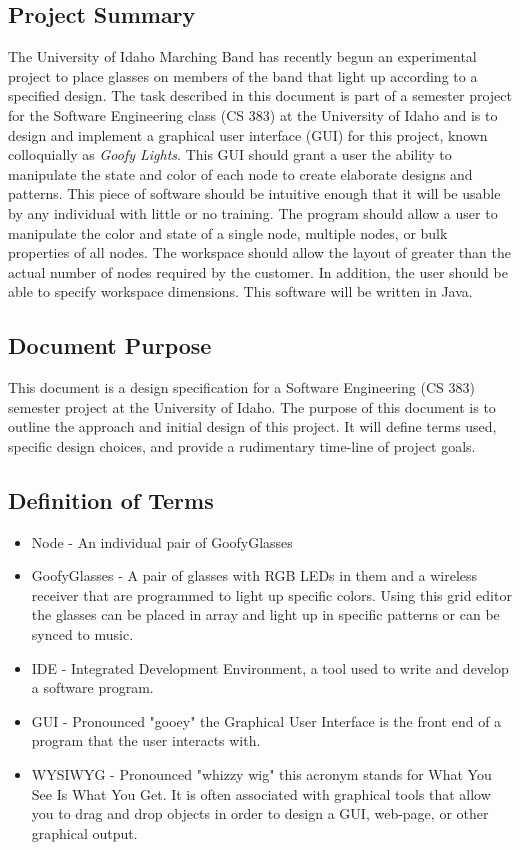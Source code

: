 \documentclass[12pt]{article}
\begin{document}
		\subsection{Project Summary}
  		The University of Idaho Marching Band has recently begun an experimental project to place glasses on members of the band that light up according to a specified design. The task described in this document is part of a semester project for the Software Engineering class (CS 383) at the University of Idaho and is to design and implement a graphical user interface (GUI) for this project, known colloquially as \textit{Goofy Lights}. This GUI should grant a user the ability to manipulate the state and color of each node to create elaborate designs and patterns. This piece of software should be intuitive enough that it will be usable by any individual with little or no training. The program should allow a user to manipulate the color and state of a single node, multiple nodes, or bulk properties of all nodes. The workspace should allow the layout of greater than the actual number of nodes required by the customer. In addition, the user should be able to specify workspace dimensions. This software will be written in Java.
		
		\subsection{Document Purpose}
  		This document is a design specification for a Software Engineering (CS 383) semester project at the University of Idaho. The purpose of this document is to outline the approach and initial design of this project. It will define terms used, specific design choices, and provide a rudimentary time-line of project goals. 
		
		\subsection{Definition of Terms}
		\begin{itemize}
			\item Node - An individual pair of GoofyGlasses
			\item GoofyGlasses - A pair of glasses with RGB LEDs in them and a wireless receiver that are programmed to light up specific colors. Using this grid editor the glasses can be placed in array and light up in specific patterns or can be synced to music.
			\item IDE - Integrated Development Environment, a tool used to write and develop a software program.
			\item GUI - Pronounced "gooey" the Graphical User Interface is the front end of a program that the user interacts with.
			\item WYSIWYG - Pronounced "whizzy wig" this acronym stands for What You See Is What You Get. It is often associated with graphical tools that allow you to drag and drop objects in order to design a GUI, web-page, or other graphical output. 			
		\end{itemize}
		
\end{document}
